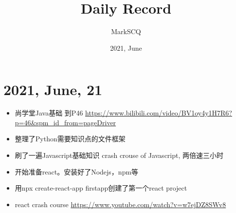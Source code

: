 \documentclass[UTF8]{article}
\title{Daily Record}
\author{MarkSCQ}
\date{2021, June}
\begin{document}
\maketitle

\tableofcontents

\newpage
\section{2021, June, 21}
\begin{itemize}
    \setlength\itemsep{0em}
    \item 尚学堂Java基础 到P46 \url{https://www.bilibili.com/video/BV1oy4y1H7R6?p=46&spm_id_from=pageDriver}
    \item 整理了Python需要知识点的文件框架
    \item 刷了一遍Javascript基础知识 crash crouse of Javascript, 两倍速三小时
    \item 开始准备react。安装好了Nodejs，npm等
    \item 用npx create-react-app firstapp创建了第一个react project
    \item react crash course \url{https://www.youtube.com/watch?v=w7ejDZ8SWv8} 
\end{itemize}
\end{document}
